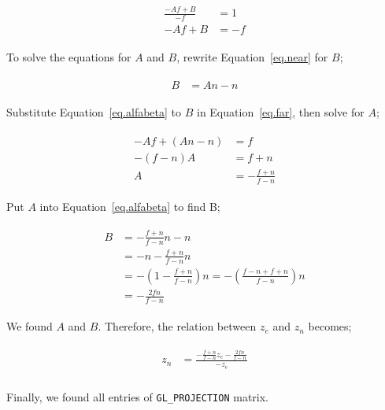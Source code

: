 \begin{equation}
\begin{aligned}
\begin{split}
    \frac{-Af+B}{-f} &= 1\\
    -Af+B &= -f
\end{split}    
\end{aligned}
\label{eq.far}
\end{equation}

To solve the equations for $A$ and $B$, rewrite Equation~\ref{eq.near} for $B$;

\begin{equation}
\begin{aligned}
\begin{split}
    B &= An-n
\end{split}    
\end{aligned}
\label{eq.alfabeta}
\end{equation}


Substitute Equation~\ref{eq.alfabeta} to $B$ in Equation~\ref{eq.far}, then solve for $A$; 

\begin{equation}
\begin{aligned}
\begin{split}
    -Af + (An-n)&=f\\
    -(f-n)A&=f+n\\
    A&=-\frac{f+n}{f-n}
\end{split}    
\end{aligned}
\label{eq.alfa}
\end{equation}

Put $A$ into Equation~\ref{eq.alfabeta} to find B;

\begin{equation}
\begin{aligned}
\begin{split}
    B &= -\frac{f+n}{f-n}n-n\\
      &= -n-\frac{f+n}{f-n}n\\
      &=-\left(1-\frac{f+n}{f-n}\right)n
      =-\left(\frac{f-n+f+n}{f-n}\right)n\\
      &=-\frac{2fn}{f-n}
\end{split}    
\end{aligned}
\label{eq.beta}
\end{equation}

We found $A$ and $B$. Therefore, the relation between $z_e$ and $z_n$ becomes; 

\begin{equation}
\begin{aligned}
\begin{split}
    z_n &= \frac{-\frac{f+n}{f-n}z_e-\frac{2fn}{f-n}}{-z_e}\\
\end{split}    
\end{aligned}
\label{eq.znfinal}
\end{equation}

Finally, we found all entries of \verb|GL_PROJECTION| matrix.